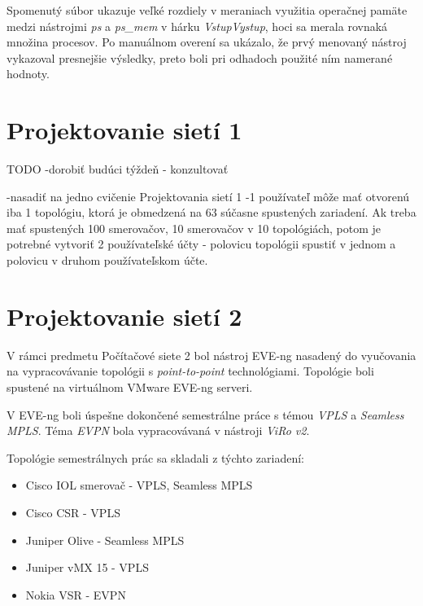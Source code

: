Spomenutý súbor ukazuje veľké rozdiely v meraniach využitia operačnej pamäte medzi nástrojmi \emph{ps} a \emph{ps\_mem} v hárku \emph{VstupVystup}, hoci sa merala rovnaká množina procesov. Po manuálnom overení sa ukázalo, že prvý menovaný nástroj vykazoval presnejšie výsledky, preto boli pri odhadoch použité ním namerané hodnoty.





\section{Projektovanie sietí 1}

{\huge TODO -dorobiť budúci týždeň - konzultovať}

-nasadiť na jedno cvičenie Projektovania sietí 1
-1 používateľ môže mať otvorenú iba 1 topológiu, ktorá je obmedzená na 63 súčasne spustených zariadení. Ak treba mať spustených 100 smerovačov, 10 smerovačov v 10 topológiách, potom je potrebné vytvoriť 2 používateľské účty - polovicu topológii spustiť v jednom a polovicu v druhom používateľskom účte.





\section{Projektovanie sietí 2}

V rámci predmetu Počítačové siete 2 bol nástroj EVE-ng nasadený do vyučovania na vypracovávanie topológii s \emph{point-to-point} technológiami. Topológie boli spustené na virtuálnom VMware EVE-ng serveri.

V EVE-ng boli úspešne dokončené semestrálne práce s témou \emph{VPLS} a \emph{Seamless MPLS}. Téma \emph{EVPN} bola vypracovávaná v nástroji \emph{ViRo v2}.

Topológie semestrálnych prác sa skladali z týchto zariadení:

\begin{itemize}[noitemsep]
    \item Cisco IOL smerovač - VPLS, Seamless MPLS
    \item Cisco CSR - VPLS
    \item Juniper Olive - Seamless MPLS
    \item Juniper vMX 15 - VPLS
    \item Nokia VSR - EVPN
\end{itemize}





